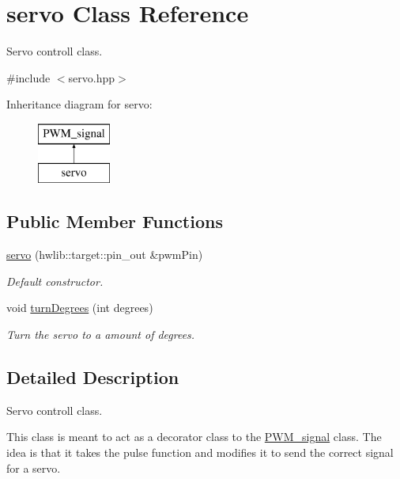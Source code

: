 \hypertarget{classservo}{}\section{servo Class Reference}
\label{classservo}


Servo controll class.  




{\ttfamily \#include $<$servo.\+hpp$>$}

Inheritance diagram for servo\+:\begin{figure}[H]
\begin{center}
\leavevmode
\includegraphics[height=2.000000cm]{classservo}
\end{center}
\end{figure}
\subsection*{Public Member Functions}
\begin{DoxyCompactItemize}
\item 
\hyperlink{classservo_a99c6a39c75cd91b8b2c498cca77d7239}{servo} (hwlib\+::target\+::pin\+\_\+out \&pwm\+Pin)
\begin{DoxyCompactList}\small\item\em Default constructor. \end{DoxyCompactList}\item 
void \hyperlink{classservo_ac0fa39642e5294471844d1fd56e9fec5}{turn\+Degrees} (int degrees)
\begin{DoxyCompactList}\small\item\em Turn the servo to a amount of degrees. \end{DoxyCompactList}\end{DoxyCompactItemize}


\subsection{Detailed Description}
Servo controll class. 

This class is meant to act as a decorator class to the \hyperlink{class_p_w_m__signal}{P\+W\+M\+\_\+signal} class. The idea is that it takes the pulse function and modifies it to send the correct signal for a servo. 

